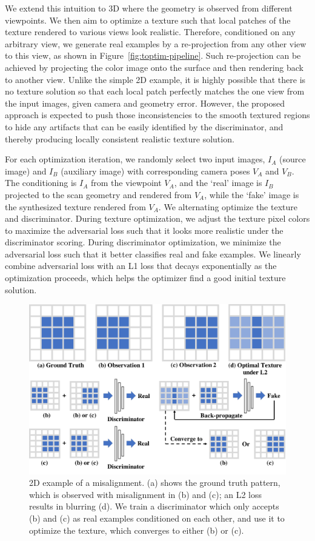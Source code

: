 %
We extend this intuition to 3D where the geometry is observed from different viewpoints.
%
We then aim to optimize a texture such that local patches of the texture rendered to various views look realistic.
%
Therefore, conditioned on any arbitrary view, we generate real examples by a re-projection from any other view to this view, as shown in Figure~\ref{fig:toptim-pipeline}.
%
Such re-projection can be achieved by projecting the color image onto the surface and then rendering back to another view.
%
Unlike the simple 2D example, it is highly possible that there is no texture solution so that each local patch perfectly matches the one view from the input images, given camera and geometry error.
%
However, the proposed approach is expected to push those inconsistencies to the smooth textured regions to hide any artifacts that can be easily identified by the discriminator, and thereby producing locally consistent realistic texture solution.
%

%
For each optimization iteration, we randomly select two input images, $I_A$ (source image) and $I_B$ (auxiliary image) with corresponding camera poses $V_A$ and $V_B$.
%
The conditioning is $I_A$ from the viewpoint $V_A$, and the `real' image is $I_B$ projected to the scan geometry and rendered from $V_A$, while the `fake' image is the synthesized texture rendered from $V_A$.
%
We alternating optimize the texture and discriminator.
%
During texture optimization, we adjust the texture pixel colors to maximize the adversarial loss such that it looks more realistic under the discriminator scoring.
%
During discriminator optimization, we minimize the adversarial loss such that it better classifies real and fake examples.
%
We linearly combine adversarial loss with an L1 loss that decays exponentially as the optimization proceeds, which helps the optimizer find a good initial texture solution.
%


\begin{figure}
    \centering
    \includegraphics[width=0.75\linewidth]{texturegen/figures/intuitive.pdf}
    \caption{2D example of a misalignment. (a) shows the ground truth pattern, which is observed with misalignment in (b) and (c); an L2 loss results in blurring (d). 
    We train a discriminator which only accepts (b) and (c) as real examples conditioned on each other, and use it to optimize the texture, which converges to either (b) or (c).}
    \label{fig:toptim-misalign-example}
\end{figure}

